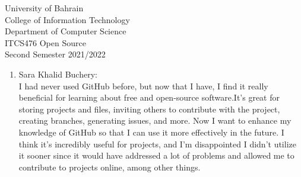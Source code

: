 \documentclass[12pt]{article}
\begin{document}
   \begin{enumerate}
   {\Large University of Bahrain}\\
   College of Information Technology\\
   Department of Computer Science\\
   ITCS476 Open Source\\
   Second Semester 2021/2022\\[0.2cm]
 

\bigskip
   \renewcommand{\arraystretch}{1.4}   %
   
   \end{enumerate}

\begin{enumerate}
  \item Sara Khalid Buchery:\\
   I had never used GitHub before, but now that I have, I find it really beneficial for learning about free and open-source software.It's great for storing projects and files, inviting others to contribute with the project, creating branches, generating issues, and more. Now I want to enhance my knowledge of GitHub so that I can use it more effectively in the future. I think it's incredibly useful for projects, and I'm disappointed I didn't utilize it sooner since it would have addressed a lot of problems and allowed me to contribute to projects online, among other things.\\
      
\end{enumerate}
\end{document}
